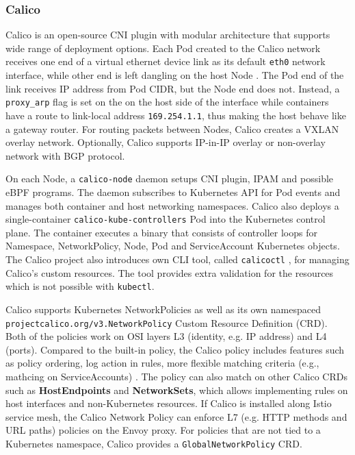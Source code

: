 \documentclass[english, 12pt, a4paper, sci, utf8, a-2b, online]{aaltothesis}
\begin{document}


\subsubsection{Calico}

Calico \cite{calico} is an open-source CNI plugin with modular architecture that supports wide range of deployment options. Each Pod created to the Calico network receives one end of a virtual ethernet device link as its default \texttt{eth0} network interface, while other end is left dangling on the host Node \cite{calico-tkng}. The Pod end of the link receives IP address from Pod CIDR, but the Node end does not. Instead, a \texttt{proxy\_arp} flag is set on the on the host side of the interface while containers have a route to link-local address \texttt{169.254.1.1}, thus making the host behave like a gateway router. For routing packets between Nodes, Calico creates a VXLAN overlay network. Optionally, Calico supports IP-in-IP overlay or non-overlay network with BGP protocol.

On each Node, a \texttt{calico-node} daemon setups CNI plugin, IPAM and possible eBPF programs. The daemon subscribes to Kubernetes API for Pod events and manages both container and host networking namespaces. Calico also deploys a single-container \texttt{calico-kube-controllers} Pod into the Kubernetes control plane. The container executes a binary that consists of controller loops for Namespace, NetworkPolicy, Node, Pod and ServiceAccount Kubernetes objects. The Calico project also introduces own CLI tool, called \texttt{calicoctl} \cite{calicoctl}, for managing Calico's custom resources. The tool provides extra validation for the resources which is not possible with \texttt{kubectl}.

Calico supports Kubernetes NetworkPolicies as well as its own namespaced \\\texttt{projectcalico.org/v3.NetworkPolicy} Custom Resource Definition (CRD). Both of the policies work on OSI layers L3 (identity, e.g. IP address) and L4 (ports). Compared to the built-in policy, the Calico policy includes features such as policy ordering, log action in rules, more flexible matching criteria (e.g., mathcing on ServiceAccounts) \cite{calico-network-policy}. The policy can also match on other Calico CRDs such as \textbf{HostEndpoints} and \textbf{NetworkSets}, which allows implementing rules on host interfaces and non-Kubernetes resources. If Calico is installed along Istio service mesh, the Calico Network Policy can enforce L7 (e.g. HTTP methods and URL paths) policies on the Envoy proxy. For policies that are not tied to a Kubernetes namespace, Calico provides a \texttt{GlobalNetworkPolicy} CRD.
\end{document}
